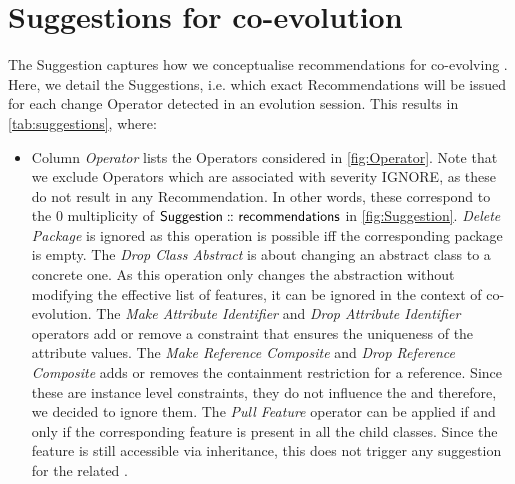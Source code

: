 \section{Suggestions for \viewtype co-evolution} 
\label{sec:Approach}

The \textsf{Suggestion} \metamodel captures how we
conceptualise recommendations for co-evolving \viewtypes. Here, we detail the \textsf{Suggestion}s, i.e. which exact \textsf{Recommendation}s
will be issued for each change \textsf{Operator} detected in an evolution
session. This results in \cref{tab:suggestions}, where:
\begin{itemize}
	\item Column \textsl{Operator} lists the \textsf{Operator}s considered in \cref{fig:Operator}. Note that we exclude \textsf{Operator}s which are associated with severity \textsf{IGNORE}, as these do not result in any \textsf{Recommendation}. In other words, these correspond to the \textsf{0} multiplicity of $\mathsf{Suggestion} \,\colon\!\!\!\colon \mathsf{recommendations}$ in \cref{fig:Suggestion}. \textit{Delete Package} is ignored as this operation is possible iff the corresponding package is empty. The \textit{Drop Class Abstract} is about changing an abstract class to a concrete one. 
 As this operation only changes the abstraction without modifying the effective list of features, it can be ignored in the context of \viewtype co-evolution. The \textit{Make Attribute Identifier} and \textit{Drop Attribute Identifier} operators add or remove a constraint that ensures the uniqueness of the attribute values. 
    The \textit{Make Reference Composite} and \textit{Drop Reference Composite} adds or removes the containment restriction for a reference. Since these are instance level constraints, they do not influence the \viewtype and therefore, we decided to ignore them. The \textit{Pull Feature} operator can be applied if and only if the corresponding feature is present in all the child classes. Since the feature is still accessible via inheritance, this does not trigger any suggestion for the related \viewtypes.
 

\end{itemize}
